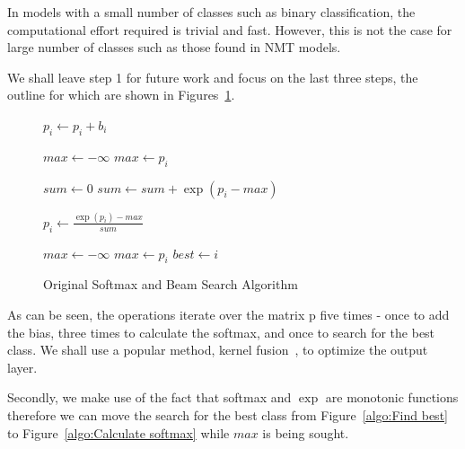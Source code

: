 \documentclass[11pt,a4paper]{article}
\begin{document}
In models with a small number of classes such as binary classification, the computational effort required is trivial and fast. However, this is not the case for large number of classes such as those found in NMT models.

We shall leave step 1 for future work and focus on the last three steps, the outline for which are shown in Figures~\ref{algo:original-softmax-beamsearch}.

\begin{figure} 
\begin{algorithmic}

  \State $p_i \gets p_i + b_i$
\EndFor 
\EndProcedure

\State


\State $max \gets - \infty$ 
    \State $max \gets p_i$
  \EndIf
\EndFor

\State $sum \gets 0$ 
  \State $sum \gets sum + \exp(p_i - max)$
\EndFor

  \State $p_i \gets \frac{\exp(p_i) - max}{sum} $
\EndFor 

\EndProcedure

\State


\State $max \gets - \infty$ 
    \State $max \gets p_i$
    \State $best \gets i$
  \EndIf
\EndFor 

\EndProcedure

\end{algorithmic}
\caption{Original Softmax and Beam Search Algorithm}
\label{algo:original-softmax-beamsearch}
\end{figure}


As can be seen, the operations iterate over the matrix p five times - once to add the bias, three times to calculate the softmax, and once to search for the best class. We shall use a popular method, kernel fusion~\citep{Guevara2009EnablingTP}, to optimize the output layer.

Secondly, we make use of the fact that softmax and $\exp$ are monotonic functions therefore we can move the search for the best class from Figure~\ref{algo:Find best} to Figure~\ref{algo:Calculate softmax} while $max$ is being sought.
\end{document}
